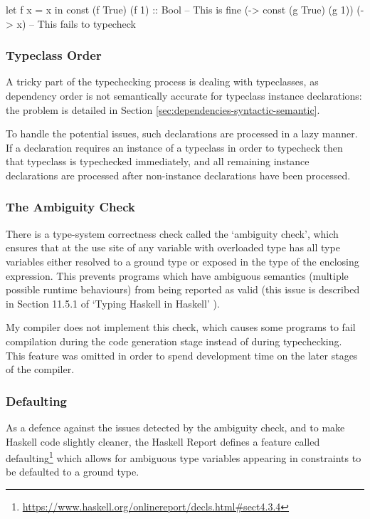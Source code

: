 \documentclass[dissertation.tex]{subfiles}
\begin{document}
{{{            \begin{haskellfigure}
            let f x = x in const (f True) (f 1) :: Bool -- This is fine
            (\g -> const (g True) (g 1)) (\x -> x)      -- This fails to typecheck
            \end{haskellfigure}
        }
        \subsubsection*{Typeclass Order}
        {
            A tricky part of the typechecking process is dealing with typeclasses, as dependency order is not semantically accurate for typeclass instance declarations: the problem is detailed in Section \ref{sec:dependencies-syntactic-semantic}.
            
            To handle the potential issues, such declarations are processed in a lazy manner. If a declaration requires an instance of a typeclass in order to typecheck then that typeclass is typechecked immediately, and all remaining instance declarations are processed after non-instance declarations have been processed.
        }
        \subsubsection*{The Ambiguity Check}
        {
            There is a type-system correctness check called the `ambiguity check', which ensures that at the use site of any variable with overloaded type has all type variables either resolved to a ground type or exposed in the type of the enclosing expression. This prevents programs which have ambiguous semantics (multiple possible runtime behaviours) from being reported as valid (this issue is described in Section 11.5.1 of `Typing Haskell in Haskell' \cite{THIH}). 

            My compiler does not implement this check, which causes some programs to fail compilation during the code generation stage instead of during typechecking. This feature was omitted in order to spend development time on the later stages of the compiler.
        }
        \subsubsection*{Defaulting}
        {
            As a defence against the issues detected by the ambiguity check, and to make Haskell code slightly cleaner, the Haskell Report defines a feature called defaulting\footnote{\url{https://www.haskell.org/onlinereport/decls.html\#sect4.3.4}} which allows for ambiguous type variables appearing in  constraints to be defaulted to a ground type. 

}}}
\end{document}
